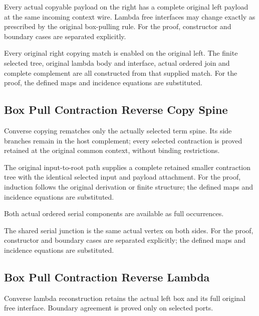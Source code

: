 Every actual copyable payload on the right has a complete original left payload at the same incoming context wire. Lambda free interfaces may change exactly as prescribed by the original box-pulling rule.
For the proof, constructor and boundary cases are separated explicitly.
\par{}

Every original right copying match is enabled on the original left. The finite selected tree, original lambda body and interface, actual ordered join and complete complement are all constructed from that supplied match.
For the proof, the defined maps and incidence equations are substituted.
\par{}

\subsection{Box Pull Contraction Reverse Copy Spine}
Converse copying rematches only the actually selected term spine. Its side branches remain in the host complement; every selected contraction is proved retained at the original common context, without binding restrictions.

The original input-to-root path supplies a complete retained smaller contraction tree with the identical selected input and payload attachment.
For the proof, induction follows the original derivation or finite structure; the defined maps and incidence equations are substituted.
\par{}

Both actual ordered serial components are available as full occurrences.
\par{}

The shared serial junction is the same actual vertex on both sides.
For the proof, constructor and boundary cases are separated explicitly; the defined maps and incidence equations are substituted.
\par{}

\subsection{Box Pull Contraction Reverse Lambda}
Converse lambda reconstruction retains the actual left box and its full original free interface. Boundary agreement is proved only on selected ports.

